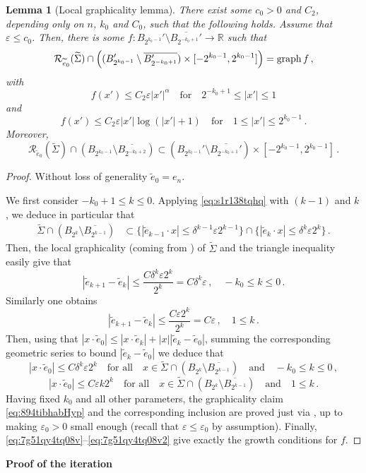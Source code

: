 \documentclass{article}
\newcommand{\R}{\mathbb{R}}
\newcommand{\ep}{\varepsilon}
\newtheorem{lemma}[theorem]{Lemma}
\theoremstyle{definition}
\begin{document}
\begin{lemma}[Local graphicality lemma]\label{lem:grphregnHyp}
    There exist some $c_0>0$ and $C_2$, depending only on $n$, $k_0$ and $C_0$, such that the following holds. Assume that $\ep\leq c_0$. Then, there is some $f:B_{2^{k_0-1}}'\setminus \overline{B_{2^{-k_0+1}}'}\to\R$ such that
    \begin{equation}\label{eq:894tibhabHyp}
        \mathcal R_{\widetilde e_0}(\widetilde \Sigma)\cap \left((B_{2^{k_0-1}}'\setminus \overline{B_{2^{-k_0+1}}'})\times [-2^{k_0-1},2^{k_0-1}]\right)={\rm graph}\, f\,,
    \end{equation}
with
$$f(x')\leq C_2\ep|x'|^{\alpha}\quad\mbox{for}\quad 2^{-k_0+1}\leq|x'|\leq 1$$
and
$$f(x')\leq C_2\ep|x'|\log(|x'|+1)\quad\mbox{for}\quad 1\leq|x'|\leq 2^{k_0-1}\,.$$
Moreover,
$$\mathcal R_{\widetilde e_0}(\widetilde \Sigma) \cap (B_{2^{k_0-1}}\setminus \overline{B_{2^{-k_0+2}}})\subset (B_{2^{k_0-1}}'\setminus \overline{B_{2^{-k_0+1}}'})\times [-2^{k_0-1},2^{k_0-1}]\,.$$
\end{lemma}
\begin{proof}
    Without loss of generality $\widetilde e_0=e_n$.

    We first consider $-k_0+1\leq k\leq 0$. Applying \eqref{eq:s1r138tqhq} with $(k-1)$ and $k$, we deduce in particular that
\begin{align}\label{eq:t2831t41gtq}
    \widetilde \Sigma \cap (B_{2^{k}}\setminus \overline{B_{2^{k-1}}})&\subset \{|\widetilde e_{k-1}\cdot x|\leq \delta^{k-1}\ep 2^{k-1}\}\cap \{|\widetilde e_{k}\cdot x|\leq \delta^k\ep 2^k\}\,.
\end{align}
Then,  the local graphicality (coming from ) of $\widetilde \Sigma$ and the triangle inequality easily give that
$$
|\widetilde e_{k+1}-\widetilde e_{k}|\leq \frac{C\delta^k\ep 2^k}{2^k}=C\delta^k\ep\,,\quad -k_0\leq k\leq 0\,.
$$
Similarly one obtains
$$
|\widetilde e_{k+1}-\widetilde e_{k}|\leq \frac{C\ep 2^k}{2^k}=C\ep\,,\quad 1\leq k\,.
$$
Then, using that $|x\cdot\widetilde e_0|\leq |x\cdot \widetilde e_k|+|x||\widetilde e_k-\widetilde e_0|$, summing the corresponding geometric series to bound $|\widetilde e_k-\widetilde e_0|$ we deduce that
    \begin{equation}\label{eq:7g51qy4tq08v}
    |x\cdot \widetilde e_0|\leq C\delta^{k}\ep2^k\quad \mbox{for all}\quad x\in\widetilde \Sigma\cap(B_{2^{k}}\setminus \overline{B_{2^{k-1}}})\quad\mbox{and}\quad -k_0\leq k \leq 0\,,
\end{equation}
    \begin{equation}\label{eq:7g51qy4tq08v2}
    |x\cdot \widetilde e_0|\leq C\ep k2^{k}\quad\mbox{for all}\quad x\in\widetilde \Sigma\cap(B_{2^{k}}\setminus \overline{B_{2^{k-1}}})\quad\mbox{and}\quad 1\leq k\,.
\end{equation}
Having fixed $k_0$ and all other parameters, the graphicality claim \eqref{eq:894tibhabHyp} and the corresponding inclusion are proved just via , up to making $\ep_0>0$ small enough (recall that $\ep\leq \ep_0$ by assumption). Finally, \eqref{eq:7g51qy4tq08v}--\eqref{eq:7g51qy4tq08v2} give exactly the growth conditions for $f$.
\end{proof}
{\bf Proof of the iteration}
\end{document}
